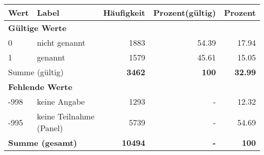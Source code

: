      \begin{longtable}{lXrrr}
     \toprule
     \textbf{Wert} & \textbf{Label} & \textbf{Häufigkeit} & \textbf{Prozent(gültig)} & \textbf{Prozent} \\
     \endhead
     \midrule
     \multicolumn{5}{l}{\textbf{Gültige Werte}}\\

     0 &
     \multicolumn{1}{X}{ nicht genannt   } &


       \num{1883} &
       \num[round-mode=places,round-precision=2]{54,39} &
         \num[round-mode=places,round-precision=2]{17,94} \\

     1 &
     \multicolumn{1}{X}{ genannt   } &


       \num{1579} &
       \num[round-mode=places,round-precision=2]{45,61} &
         \num[round-mode=places,round-precision=2]{15,05} \\
     \midrule
     \multicolumn{2}{l}{Summe (gültig)} &
       \textbf{\num{3462}} &
     \textbf{100} &
       \textbf{\num[round-mode=places,round-precision=2]{32,99}} \\
     \multicolumn{5}{l}{\textbf{Fehlende Werte}}\\
       -998 &
       keine Angabe &
         \num{1293} &
        - &
         \num[round-mode=places,round-precision=2]{12,32} \\
       -995 &
       keine Teilnahme (Panel) &
         \num{5739} &
        - &
         \num[round-mode=places,round-precision=2]{54,69} \\
     \midrule
     \multicolumn{2}{l}{\textbf{Summe (gesamt)}} &
          \textbf{\num{10494}} &
        \textbf{-} &
        \textbf{100} \\
     \bottomrule
     \end{longtable}
     
